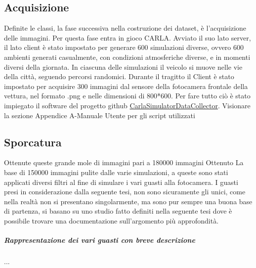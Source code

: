 \documentclass[14pt]{extarticle}
\begin{document}
\subsection{Acquisizione}
Definite le classi, la fase successiva nella costruzione dei dataset, è l'acquisizione delle immagini.
Per questa fase entra in gioco CARLA. Avviato il suo lato server, il lato client è stato impostato per generare 600 simulazioni diverse, ovvero 600 ambienti generati casualmente, con condizioni atmosferiche diverse, e in momenti diversi della giornata. In ciascuna delle simulazioni il veicolo si muove nelle vie della città, seguendo percorsi randomici. Durante il tragitto il Client è stato impostato per acquisire 300 immagini dal sensore della fotocamera frontale della vettura, nel formato .png e nelle dimensioni di 800*600.
Per fare tutto ciò è stato impiegato il software del progetto github \href{https://github.com/enginBozkurt/CarlaSimulatorDataCollector}{CarlaSimulatorDataCollector}. Visionare la sezione Appendice A-Manuale Utente per gli script utilizzati

\subsection{Sporcatura}
Ottenute queste grande mole di immagini pari a 180000 immagini
Ottenuto La base di 150000 immagini pulite dalle varie simulazioni, a queste sono stati applicati diversi filtri al fine di simulare i vari guasti alla fotocamera.
I guasti presi in considerazione dalla seguente tesi,  non sono sicuramente gli unici, come nella realtà non si presentano singolarmente, ma sono pur sempre una buona base di partenza, si basano su uno studio fatto definiti nella seguente tesi \cite{secci2020failures} dove è possibile trovare una documentazione sull'argomento più approfondità.
\subparagraph{Rappresentazione dei vari guasti con breve descrizione}
...
\end{document}
